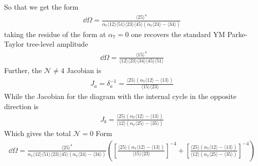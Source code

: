\documentclass[letter,11pt]{article}
\newcommand{\ab}[1]{\langle #1 \rangle}
\begin{document}
So that we get the form
\begin{equation}
	\begin{aligned}
		\dd \Omega=	\frac{\ab{25}^4}{\alpha_7 \ab{12}\ab{51}\ab{23}\ab{45}\left(\alpha_7\ab{24}-\ab{34}\right)}
	\end{aligned}
\end{equation}
taking the residue of the form at $\alpha_7=0$ one recovers the standard YM Parke-Taylor tree-level amplitude
\begin{equation}
	\begin{aligned}
		\dd \Omega=	\frac{\ab{15}^4}{ \ab{12}\ab{23}\ab{34}\ab{45}\ab{51}}
	\end{aligned}
\end{equation}
Further, the $\mathcal{N} \neq4$ Jacobian is
\begin{equation}
	\begin{aligned}
		J_a=\delta_a^{-1}=
		\frac{\ab{25}\left(\alpha_7\ab{12}-\ab{13}\right)}{\ab{15}\ab{23}}
	\end{aligned}
\end{equation}
While the Jacobian for the diagram with the internal cycle in the opposite direction is
\begin{equation}
	\begin{aligned}
		J_b=
		\frac{\ab{25}\left(\alpha_7\ab{12}-\ab{13}\right)}{\ab{12}\left(\alpha_7\ab{25}-\ab{35}\right)}
	\end{aligned}
\end{equation}
Which gives the total $\mathcal{N}=0$ Form
\begin{equation}
	\begin{aligned}
		 \dd\Omega =\frac{\ab{25}^4}{\alpha_7 \ab{12}\ab{51}\ab{23}\ab{45}\left(\alpha_7\ab{24}-\ab{34}\right)}\left(	\left[\frac{\ab{25}\left(\alpha_7\ab{12}-\ab{13}\right)}{\ab{15}\ab{23}}\right]^{-4}+
		\left[\frac{\ab{25}\left(\alpha_7\ab{12}-\ab{13}\right)}{\ab{12}\left(\alpha_7\ab{25}-\ab{35}\right)}\right]^{-4}\right)
	\end{aligned}
\end{equation}
\end{document}
